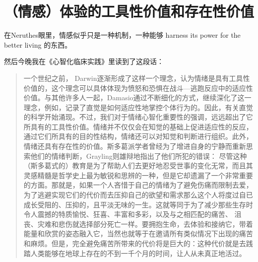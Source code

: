 \chapter{（情感）体验的工具性价值和存在性价值}




在Neruthes眼里，情感似乎只是一种机制，一种能够 harness its power for the better living 的东西。

然后今晚我在《心智化临床实践》里读到了这段话：

\blockquote{
一个世纪之前， Darwin逐渐形成了这样一个理念，认为情绪是具有工具性价值的，这个理念可以具体体现为愤怒和恐惧在战斗—逃跑反应中的适应性价值。与其他许多人一起，Damasio通过不断细化的方式，继续深化了这一理念，例如，记录了直觉是如何适应性地掌控个体行为的。因此，有关直觉的科学开始涌现。不过，我们对于情绪心智化重要性的强调，远远超出了它所具有的工具性价值。情绪并不仅仅会在知觉的基础上促进适应性的反应，通过它们所具有的目的性结构，情绪还可以对知觉和判断进行组织。此外，情绪还具有存在性的价值。斯多葛派学者曾经为了增进自身的宁静而重新思索他们的情绪判断，Grayling则雄辩地指出了他们所犯的错误：
尽管这种（斯多葛式的）教育是为了帮助人们去更好地忍受世事的变化无常，而且其灵感精髓是哲学史上最为敏锐和思辨的一种，但是它却遗漏了一个非常重要的方面。那就是，如果一个人吝惜于自己的情绪为了避免伤痛而限制去爱，为了逃避实现它们的代价而去压抑自己的欲望和需求那么这个人将度过自已成长受阻的、压抑的，且平淡无味的一生。这就等同于为了减少那些生存时令人震撼的特质\pozhehao{}愉悦、狂喜、丰富和多彩，以及与之相匹配的痛苦、 沮丧、灾难和悲伤\pozhehao{}就选择部分死亡一样。要拥抱生命，去体验和接纳它，带着能量和欣赏的姿态融入它，当然也就等于在邀请所有类似情况下出现的痛苦和麻烦。但是，完全避免痛苦所带来的代价将是巨大的：这种代价就是去践踏人类能够在地球上存在的不到一千个月的时间，让人从未真正地活过。
}

\tristarsepline

